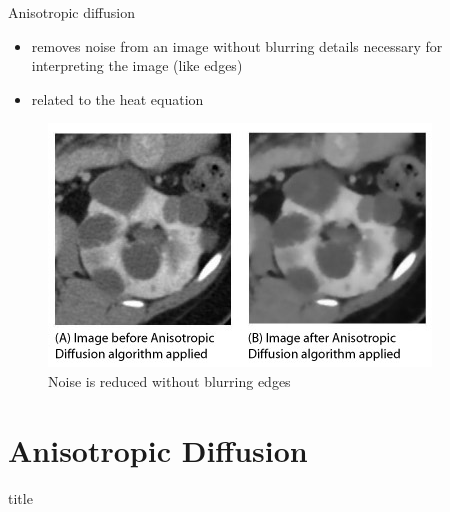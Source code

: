 \documentclass{beamer}
\begin{document}
\begin{frame}{Anisotropic diffusion}
    
    \begin{itemize}
        \item removes noise from an image without blurring details necessary for interpreting the image (like edges)
        \item related to the heat equation
    \end{itemize}
    
    \begin{figure}[h!]
            \centering            \includegraphics[scale=0.6]{anisodif1.jpg}
            \caption{Noise is reduced without blurring edges}
    \end{figure}

\end{frame}

\section{Anisotropic Diffusion}

\begin{frame}
  \vfill
  \centering
  \begin{beamercolorbox}[sep=8pt,center,shadow=true,rounded=true]{title}
    \par%
  \end{beamercolorbox}
  \vfill
\end{frame}
\end{document}
